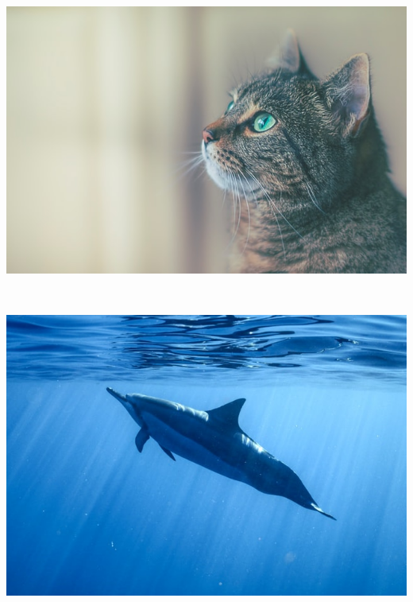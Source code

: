 \documentclass[11pt, a4paper]{article}
\begin{document}
\begin{example}
\begin{gridlayout}{\textwidth}{11cm}
\begin{row}{0.3}
\begin{cell}{0.3}
                \includegraphics[width=\cellwidth, height=\rowheight, keepaspectratio]{img/cat.jpg}
            \end{cell}
            \begin{cell}{0.05}
                ~
            \end{cell}
            \begin{cell}{0.3}
                \includegraphics[width=\cellwidth, height=\rowheight, keepaspectratio]{img/dolphin.jpg}
            \end{cell}
            \begin{cell}{0.05}
                ~
            \end{cell}
            \begin{cell}{0.3}
                \centering
                \vspace{1em}
                \begin{tabular}{lr}

\end{tabular}
\end{cell}
\end{row}
\end{gridlayout}
\end{example}
\end{document}

